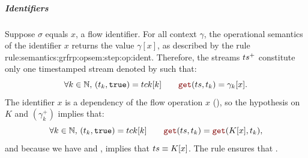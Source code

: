 \begin{skippableproof}
    \subparagraph{Identifiers}
    Suppose $\sigma$ equals $x$, a flow identifier. For all context $\gamma$, the operational
    semantics of the identifier $x$ returns the value $\gamma[x]$, as described by the rule \nameref
    {rule:semantics:grfrp:opsem:step:op:ident}. Therefore, the streams $ts^+$ constitute only one
    timestamped stream denoted by \ts such that:
    \begin{equation*}
        \forall k \in \N, \, (t_k, \true) = \tck[k] \qquad \getAt{\ts}{t_k} = \gamma_k[x].
    \end{equation*}
    The identifier $x$ is a dependency of the flow operation $x$ (), so the hypothesis on $K$ and $(\gamma_k^+)$ implies that:
    \begin{equation*}
        \forall k \in \N, \, (t_k, \true) = \tck[k] \qquad \getAt{\ts}{t_k} = \getAt{K[x]}{t_k},
    \end{equation*}
    and because we have \on{\ts}{\tck} and ,  implies that $ts \equiv K[x]$. The rule 
    ensures that .


\end{skippableproof}
